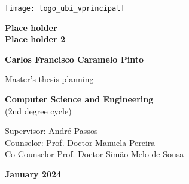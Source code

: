 \begin{titlepage}
\begin{center}

\begin{flushright}
 \texttt{[image: logo\_ubi\_vprincipal]}\\


\vspace{7.6cm}

\rostotitulo \textbf{Place holder} \\
\rostosubtit \textbf{Place holder 2}\\

\vspace{1.8cm}

\rostonomes \textbf{Carlos Francisco Caramelo Pinto}\\

\vspace{1.4cm}


\rostooutros Master's thesis planning

\rostonomes \textbf{Computer Science and Engineering}\\
\rostooutros (2nd degree cycle)\\

\vspace{3.3cm}

\rostooutros Supervisor: André Passos\\
\rostooutros Counselor: Prof. Doctor Manuela Pereira\\
\rostooutros Co-Counselor Prof. Doctor Simão Melo de Sousa

\vspace{1.4cm}

\rostooutros \textbf{January 2024}

\end{flushright}

\end{center}
\end{titlepage}
